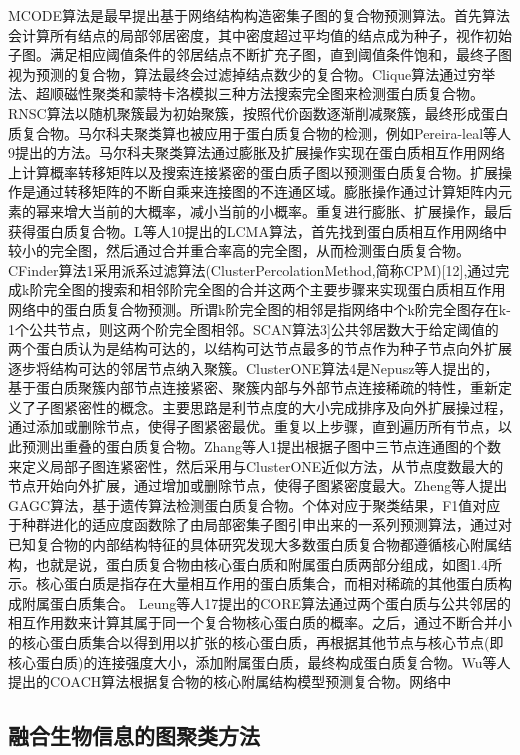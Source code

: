 MCODE算法\cite{bader_automated_2003}是最早提出基于网络结构构造密集子图的复合物预测算法。首先算法会计算所有结点的局部邻居密度，其中密度超过平均值的结点成为种子，视作初始子图。满足相应阈值条件的邻居结点不断扩充子图，直到阈值条件饱和，最终子图视为预测的复合物，算法最终会过滤掉结点数少的复合物。Clique算法\cite{spirin_protein_2003}通过穷举法、超顺磁性聚类和蒙特卡洛模拟三种方法搜索完全图来检测蛋白质复合物。RNSC算法\cite{king_protein_2004}以随机聚簇最为初始聚簇，按照代价函数逐渐削减聚簇，最终形成蛋白质复合物。马尔科夫聚类算{}也被应用于蛋白质复合物的检测，例如Pereira-leal等人9提出的方法。马尔科夫聚类算法通过膨胀及扩展操作实现在蛋白质相互作用网络上计算概率转移矩阵以及搜索连接紧密的蛋白质子图以预测蛋白质复合物。扩展操作是通过转移矩阵的不断自乘来连接图的不连通区域。膨胀操作通过计算矩阵内元素的幂来增大当前的大概率，减小当前的小概率。重复进行膨胀、扩展操作，最后获得蛋白质复合物。L等人10提出的LCMA算法，首先找到蛋白质相互作用网络中较小的完全图，然后通过合并重合率高的完全图，从而检测蛋白质复合物。CFinder算法1采用派系过滤算法(ClusterPercolationMethod,简称CPM)[12],通过完成k阶完全图的搜索和相邻阶完全图的合并这两个主要步骤来实现蛋白质相互作用网络中的蛋白质复合物预测。所谓k阶完全图的相邻是指网络中个k阶完全图存在k-1个公共节点，则这两个阶完全图相邻。SCAN算法3]公共邻居数大于给定阈值的两个蛋白质认为是结构可达的，以结构可达节点最多的节点作为种子节点向外扩展逐步将结构可达的邻居节点纳入聚簇。ClusterONE算法4是Nepusz等人提出的，基于蛋白质聚簇内部节点连接紧密、聚簇内部与外部节点连接稀疏的特性，重新定义了子图紧密性的概念。主要思路是利节点度的大小完成排序及向外扩展操过程，通过添加或删除节点，使得子图紧密最优。重复以上步骤，直到遍历所有节点，以此预测出重叠的蛋白质复合物。Zhang等人1提出根据子图中三节点连通图的个数来定义局部子图连紧密性，然后采用与ClusterONE近似方法，从节点度数最大的节点开始向外扩展，通过增加或删除节点，使得子图紧密度最大。Zheng等人提出GAGC算法，基于遗传算法检测蛋白质复合物。个体对应于聚类结果，F1值对应于种群进化的适应度函数除了由局部密集子图引申出来的一系列预测算法，通过对已知复合物的内部结构特征的具体研究发现大多数蛋白质复合物都遵循核心附属结构，也就是说，蛋白质复合物由核心蛋白质和附属蛋白质两部分组成，如图1.4所示。核心蛋白质是指存在大量相互作用的蛋白质集合，而相对稀疏的其他蛋白质构成附属蛋白质集合。
Leung等人17提出的CORE算法通过两个蛋白质与公共邻居的相互作用数来计算其属于同一个复合物核心蛋白质的概率。之后，通过不断合并小的核心蛋白质集合以得到用以扩张的核心蛋白质，再根据其他节点与核心节点(即核心蛋白质)的连接强度大小，添加附属蛋白质，最终构成蛋白质复合物。Wu等人提出的COACH算法根据复合物的核心附属结构模型预测复合物。网络中
\subsection{融合生物信息的图聚类方法}
\label{section:appendBiology}
